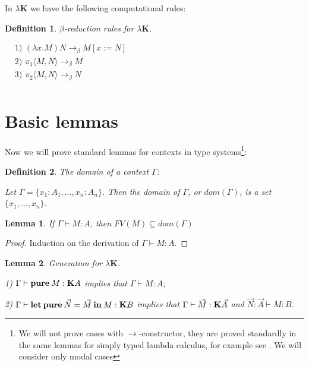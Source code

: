 \documentclass[a4paper]{article}
\newtheorem{lemma}{Lemma}
\newtheorem{defin}{Definition}
\begin{document}
  In $\lambda \textbf{K}$ we have the following computational rules:

  \begin{defin} $\beta$-reduction rules for \emph{$\lambda \textbf{K}$}.

$\begin{array}{lll}
&\text{1) } (\lambda x. M) N \rightarrow_{\beta} M [x := N]& \\
&\text{2) } \pi_1 \langle M, N \rangle \rightarrow_{\beta} M& \\
&\text{3) } \pi_2 \langle M, N \rangle \rightarrow_{\beta} N& \\
\end{array}$

  \end{defin}



  \section{Basic lemmas}

  Now we will prove standard lemmas for contexts in type systems\footnote{We will not prove cases with
  $\to$-constructor, they are proved standardly in the same lemmas for simply typed lambda calculus, for
  example see \cite{Neder}\cite{Morten}\cite{Girard}. We will consider only modal cases}:

  \begin{defin} The domain of a context $\Gamma$:

  Let $\Gamma = \{ x_1 : A_1, ..., x_n : A_n \}$. Then the domain of $\Gamma$, or $dom(\Gamma)$, is a set $\{  x_1, ..., x_n\}$.

  \end{defin}

  \begin{lemma}

  If $\Gamma \vdash M : A$, then $FV(M) \subseteq dom(\Gamma)$

  \end{lemma}

  \begin{proof}

  Induction on the derivation of $\Gamma \vdash M : A$.

  \end{proof}

  \vspace{\baselineskip}

  \begin{lemma} Generation for $\lambda \textbf{K}$.

  1) $\Gamma \vdash {\bf pure \: } M : \textbf{K}A$ implies that $\Gamma \vdash M : A$;

  2) $\Gamma \vdash {\bf let \: pure} \: \vec{N} = \vec{M} \: {\bf in} \: M : {\bf K} B$ implies that $\Gamma \vdash \vec{M} : {\bf K} \vec{A}$ and
$\vec{N} : \vec{A} \vdash M : B$.
  \end{lemma}
\end{document}

